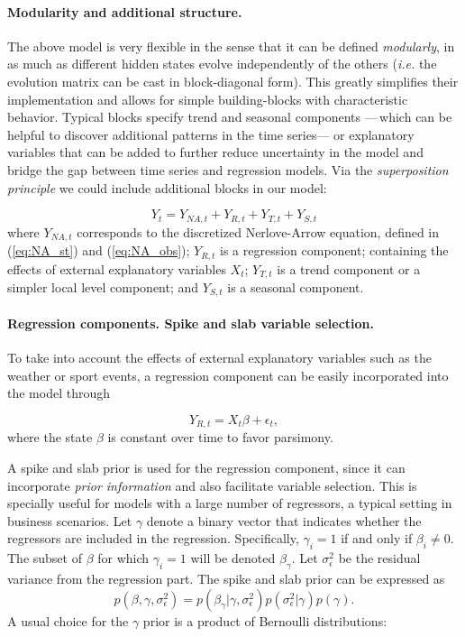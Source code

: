 \paragraph{Modularity and additional structure.}

The above model is very flexible in the sense that it can be defined \emph{modularly},  in as much as different hidden states evolve independently of the others (\emph{i.e.} the evolution matrix can be cast in block-diagonal form). This greatly simplifies their implementation and allows for simple building-blocks with characteristic behavior. Typical blocks specify trend and seasonal components ---\,which can be helpful to discover additional patterns in the time series--- or explanatory variables that can be added to further reduce  uncertainty in the model and bridge the gap between time series and regression models. Via the \emph{superposition principle} \parencite[Chapter 3]{petris2009dynamic} we could include additional blocks in our model:

$$
Y_t = Y_{NA, t} + Y_{R, t} + Y_{T, t} + Y_{S, t}
$$
where $Y_{NA, t}$ corresponds to the discretized Nerlove-Arrow equation, defined in (\ref{eq:NA_st}) and (\ref{eq:NA_obs}); $Y_{R, t}$ is a regression component; containing the effects of  external explanatory variables $X_t$; $Y_{T, t}$ is a trend component or a simpler local level component; and $Y_{S, t}$ is a seasonal component.

\paragraph{Regression components. Spike and slab variable selection.}\label{sec:s_s}

To take into account the effects of external explanatory variables such as the weather or sport events, a  regression component can be easily incorporated into the model through

$$
Y_{R,t} = X_t \beta + \epsilon_t,
$$
where the state $\beta$ is constant over time to favor parsimony.

A spike and slab prior \parencite{mitchell1988bayesian} is used for the  regression component, since it can incorporate \emph{prior information} and also facilitate variable selection. This is specially useful for models with a large number of regressors, a typical setting in business scenarios.
Let $\gamma$ denote a binary vector that indicates whether the regressors are included in the regression. Specifically, $\gamma_i = 1$ if and only if $\beta_i \neq 0$. The subset of $\beta$ for which $\gamma_i = 1$ will be denoted $\beta_{\gamma}$. Let $\sigma^2_{\epsilon}$ be the residual variance from the regression part. The spike and slab prior \parencite{george1997approaches} can be expressed as
$$
p(\beta, \gamma, \sigma^2_{\epsilon}) = p(\beta_{\gamma} | \gamma, \sigma^2_{\epsilon})p(\sigma^2_{\epsilon} | \gamma)p(\gamma).
$$
A usual choice for the $\gamma$ prior is a product of Bernoulli distributions:

